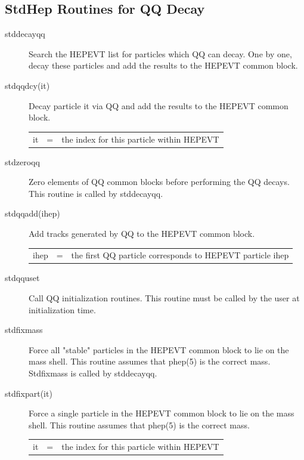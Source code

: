 \subsection{StdHep Routines for QQ Decay}

\begin{description}
\item[stddecayqq]
 Search the HEPEVT list for particles which QQ can decay.  One by one,
 decay these particles and add the results to the HEPEVT common block.

\item[stdqqdcy(it)]
  Decay particle it via QQ and add the results to the HEPEVT common block.

\begin{tabular}{lcl}
it & = & the index for this particle within HEPEVT \\
\end{tabular}

\item[stdzeroqq]
 Zero elements of QQ common blocks before performing the QQ decays.
 This routine is called by stddecayqq.

\item[stdqqadd(ihep)]
 Add tracks generated by QQ to the HEPEVT common block.

\begin{tabular}{lcl}
ihep & = & the first QQ particle corresponds to HEPEVT particle ihep \\
\end{tabular}

\item[stdqquset]
 Call QQ initialization routines.
 This routine must be called by the user at initialization time.

\item[stdfixmass]
 Force all "stable" particles in the HEPEVT common block to lie on the mass shell.
 This routine assumes that phep(5) is the correct mass.
 Stdfixmass is called by stddecayqq.

\item[stdfixpart(it)]
 Force a single particle in the HEPEVT common block to lie on the mass shell.
 This routine assumes that phep(5) is the correct mass.

\begin{tabular}{lcl}
it & = & the index for this particle within HEPEVT \\
\end{tabular}

\end{description}


